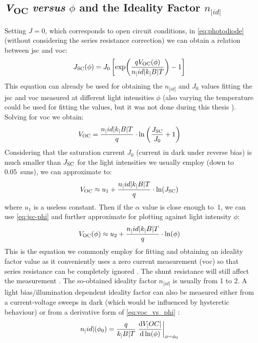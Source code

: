	\subsection{\textit{V}\textsubscript{OC} \textsl{versus} $\phi$ and the Ideality Factor $n_|id|$}\label{characterization_ideality}
		Setting $J=0$, which corresponds to open circuit conditions, in \cref{eq:photodiode} (without considering the series resistance correction) we can obtain a relation between \gls{jsc} and \gls{voc}:
		\begin{equation}
			J_\mathrm{SC}(\phi) = J_0\left[\exp(\frac{qV_\mathrm{OC} (\phi)}{n_|id|k_|B|T})-1\right]
		\end{equation}
		This equation can already be used for obtaining the $n_|id|$ and $J_0$ values fitting the \gls{jsc} and \gls{voc} measured at different light intensities $\phi$ (also varying the temperature could be used for fitting the values, but it was not done during this thesis \cite{Tvingstedt2016}).
		Solving for \gls{voc} we obtain:
		\begin{equation}V_\mathrm{OC} = \frac{n_|id|k_|B|T}{q}\cdot\ln\left(\frac{J_\mathrm{SC}}{J_0} + 1\right)\end{equation}
		Considering that the saturation current $J_0$ (current in dark under reverse bias) is much smaller than $J_\mathrm{SC}$ for the light intensities we usually employ (down to \SI{0.05}{suns}), we can approximate to:
		\begin{equation}
			V_\mathrm{OC} \approx u_1 + \frac{n_|id|k_|B|T}{q}\cdot\ln(J_\mathrm{SC})
		\end{equation}
		where $u_1$ is a useless constant.
		Then if the $\alpha$ value is close enough to~1, we can use \cref{eq:jsc-phi} and further approximate for plotting against light intensity $\phi$:
		\begin{equation}\label{eq:voc_vs_phi}
			V_\mathrm{OC} (\phi) \approx u_2 + \frac{n_|id|k_|B|T}{q}\cdot\ln(\phi)
		\end{equation}
		This is the equation we commonly employ for fitting and obtaining an ideality factor value \cite{Nelson2003} as it conveniently uses a zero current measurement (\gls{voc}) so that series resistance can be completely ignored \cite{Kirchartz2012}.
		The shunt resistance will still affect the measurement \cite{Tvingstedt2017}.
		The so-obtained ideality factor $n_|id|$ is usually from 1 to 2.
		A light bias/illumination dependent ideality factor can also be measured either from a current-voltage sweeps in dark (which would be influenced by hysteretic behaviour) or from a derivative form of \cref{eq:voc_vs_phi} \cite{Calado2019}:
		\begin{equation}
			n_|id|(\phi_0) = \frac{q}{k_|B|T} \eval{\dv{V_|OC|}{\ln(\phi)}}_{\phi=\phi_0}
		\end{equation}

